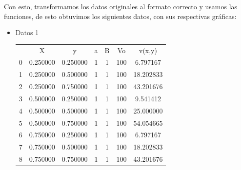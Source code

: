 Con esto, transformamos los datos originales al formato correcto y usamos las funciones, de esto obtuvimos los siguientes datos, con sus respectivas gráficas: 

\begin{itemize}
    \item Datos 1
    \begin{center}
        \begin{tabular}{lcccccc}
            & X & y & a & B & Vo & v(x,y) \\
           0 & 0.250000 & 0.250000 & 1 & 1 & 100 & 6.797167 \\
           1 & 0.250000 & 0.500000 & 1 & 1 & 100 & 18.202833 \\
           2 & 0.250000 & 0.750000 & 1 & 1 & 100 & 43.201676 \\
           3 & 0.500000 & 0.250000 & 1 & 1 & 100 & 9.541412 \\
           4 & 0.500000 & 0.500000 & 1 & 1 & 100 & 25.000000 \\
           5 & 0.500000 & 0.750000 & 1 & 1 & 100 & 54.054665 \\
           6 & 0.750000 & 0.250000 & 1 & 1 & 100 & 6.797167 \\
           7 & 0.750000 & 0.500000 & 1 & 1 & 100 & 18.202833 \\
           8 & 0.750000 & 0.750000 & 1 & 1 & 100 & 43.201676 \\
           \end{tabular}
           

\end{center}
\end{itemize}

